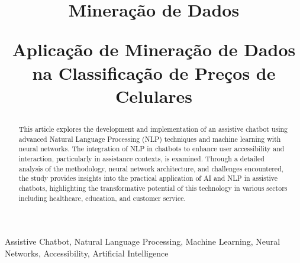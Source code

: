 \documentclass[conference]{IEEEtran}
\begin{document}
\title{Mineração de Dados 

Aplicação de Mineração de Dados na Classificação de Preços de Celulares\\
}

\author{
\and

}

\maketitle

\begin{abstract}
This article explores the development and implementation of an assistive chatbot using advanced Natural Language Processing (NLP) techniques 
and machine learning with neural networks. 
The integration of NLP in chatbots to enhance user accessibility and interaction, particularly in assistance contexts, is examined. 
Through a detailed analysis of the methodology, neural network architecture, and challenges encountered, 
the study provides insights into the practical application of AI and NLP in assistive chatbots, 
highlighting the transformative potential of this technology in various sectors including healthcare, education, and customer service.
\end{abstract}

\begin{IEEEkeywords}
Assistive Chatbot, Natural Language Processing, Machine Learning, Neural Networks, Accessibility, Artificial Intelligence
\end{IEEEkeywords}



\end{document}
